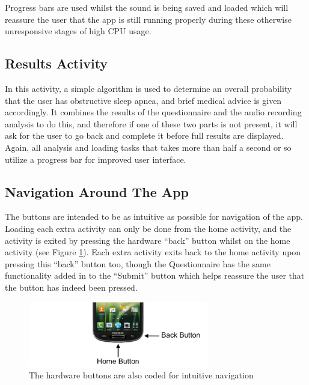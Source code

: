 Progress bars are used whilst the sound is being saved and loaded which will reassure the user that the app is still running properly during these otherwise unresponsive stages of high CPU usage. 
\subsection{Results Activity}
In this activity, a simple algorithm is used to determine an overall probability that the user has obstructive sleep apnea, and brief medical advice is given accordingly. It combines the results of the questionnaire and the audio recording analysis to do this, and therefore if one of these two parts is not present, it will ask for the user to go back and complete it before full results are displayed. Again, all analysis and loading tasks that takes more than half a second or so utilize a progress bar for improved user interface.
\subsection{Navigation Around The App}
The buttons are intended to be as intuitive as possible for navigation of the app. Loading each extra activity can only be done from the home activity, and the activity is exited by pressing the hardware ``back'' button whilst on the home activity (see Figure \ref{fig:nativeButtons}). Each extra activity exits back to the home activity upon pressing this ``back'' button too, though the Questionnaire has the same functionality added in to the ``Submit'' button which helps reassure the user that the button has indeed been pressed.
\begin{figure}[ht!]
		\centering
			\includegraphics[width=0.7\textwidth]{drawings/android_buttons.png}
		\caption{The hardware buttons are also coded for intuitive navigation \cite{samsungphone}}
		\label{fig:nativeButtons}
	\end{figure}
